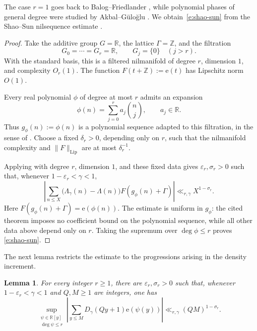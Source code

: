 \documentclass[12pt]{amsart}
\newcommand{\1}{\mathbf 1}
\newcommand{\e}{\mathrm e}
\newtheorem{lemma}[theorem]{Lemma}
\begin{document}
The case $r=1$ goes back to Balog--Friedlander
\cite{BalogFriedlander}, while polynomial phases of general
degree were studied by Akbal--G\"ulo\u{g}lu
\cite{AkbalGuloglu}.
We obtain~\eqref{e:shao-sun} from the Shao--Sun nilsequence
estimate \cite[Theorem~2.1]{ShaoSun}.

\begin{proof}
Take the additive group $G=\mathbb R$, the lattice $\Gamma=\mathbb Z$,
and the filtration
\[
 G_0=\cdots=G_r=\mathbb R,\qquad G_j=\{0\}\quad(j>r).
\]
With the standard basis, this is a filtered nilmanifold of degree $r$,
dimension $1$, and complexity $O_r(1).$ The function
$F(t+\mathbb Z):=\e(t)$ has Lipschitz norm $O(1)$.

Every real polynomial $\phi$ of degree at most $r$ admits an expansion
\[
 \phi(n)=\sum_{j=0}^{r}a_j\binom nj,\qquad a_j\in\mathbb R.
\]
Thus $g_\phi(n):=\phi(n)$ is a polynomial sequence adapted to this
filtration, in the sense of \cite[Definition~4.5]{ShaoSun}.
Choose a fixed $\delta_r>0$, depending only on $r$, such that the
nilmanifold complexity and $\|F\|_{\mathrm{Lip}}$ are at most
$\delta_r^{-1}$.

Applying \cite[Theorem~2.1]{ShaoSun} with degree $r$, dimension $1$,
and these fixed data gives $\varepsilon_r,\sigma_r>0$ such that,
whenever $1-\varepsilon_r<\gamma<1$,
\[
 \left|\sum_{n\leq X}
 \bigl(\Lambda_\gamma(n)-\Lambda(n)\bigr)
 F(g_\phi(n)+\Gamma)\right|
 \ll_{r,\gamma}X^{1-\sigma_r}.
\]
Here $F(g_\phi(n)+\Gamma)=\e(\phi(n))$. The estimate is uniform in
$g_\phi$: the cited theorem imposes no coefficient bound on the
polynomial sequence, while all other data above depend only on $r$.
Taking the supremum over $\deg\phi\leq r$ proves
\eqref{e:shao-sun}.
\end{proof}
The next lemma restricts the estimate to the progressions arising in the
density increment.

\begin{lemma}\label{l:progression-phase}
For every integer $r\geq1$, there are $\varepsilon_r,\sigma_r>0$
such that, whenever $1-\varepsilon_r<\gamma<1$ and
$Q,M\geq1$ are integers, one has
\begin{equation}\label{e:progression-phase}
 \sup_{\substack{\psi\in\mathbb R[y]\\\deg\psi\leq r}}
 \left|\sum_{y\leq M}D_\gamma(Qy+1)\e(\psi(y))\right|
 \ll_{r,\gamma}(QM)^{1-\sigma_r}.
\end{equation}
\end{lemma}
\end{document}
